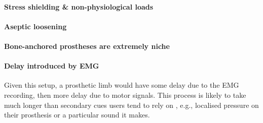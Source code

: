 \paragraph{Stress shielding \& non-physiological loads}

\paragraph{Aseptic loosening}

\paragraph{Bone-anchored prostheses are extremely niche}

\paragraph{Delay introduced by EMG}
Given this setup, a prosthetic limb would have some delay due to the EMG recording, then more delay due to motor signals. This process is likely to take much longer than secondary cues users tend to rely on \cite{schofield_applications_2014}, e.g., localised pressure on their prosthesis or a particular sound it makes.